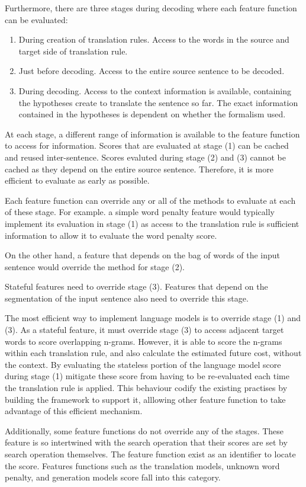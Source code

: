 \documentclass{pbml}
\begin{document}
Furthermore, there are three stages during decoding where each feature function can be evaluated:
\begin{enumerate}
    \item During creation of translation rules. Access to the words in the source and target side of translation rule.
    \item Just before decoding. Access to the entire source sentence to be decoded.
    \item During decoding. Access to the context information is available, containing the hypotheses create to translate the sentence so far. The exact information contained in the hypotheses is dependent on whether the formalism used.
\end{enumerate}
At each stage, a different range of information is available to the feature function to access for information. Scores that are evaluated at stage (1) can be cached and reused inter-sentence. Scores evaluted during stage (2) and (3) cannot be cached as they depend on the entire source sentence. Therefore, it is more efficient to evaluate as early as possible.

Each feature function can override any or all of the methods to evaluate at each of these stage. For example. a simple word penalty feature would typically implement its evaluation in stage (1) as access to the translation rule is sufficient information to allow it to evaluate the word penalty score.

On the other hand, a feature that depends on the bag of words of the input sentence would override the method for stage (2).

Stateful features need to override stage (3). Features that depend on the segmentation of the input sentence also need to override this stage. 

The most efficient way to implement language models is to override stage (1) and (3). As a stateful feature, it must override stage (3) to access adjacent target words to score overlapping n-grams. However, it is able to score the n-grams within each translation rule, and also calculate the estimated future cost, without the context. By evaluating the stateless portion of the language model score during stage (1) mitigate these score from having to be re-evaluated each time the translation rule is applied. This behaviour codify the existing practises by building the framework to support it, alllowing other feature function to take advantage of this efficient mechanism.

Additionally, some feature functions do not override any of the stages. These feature is so intertwined with the search operation that their scores are set by search operation themselves. The feature function exist as an identifier to locate the score. Features functions such as the translation models, unknown word penalty, and generation models score fall into this category.
\end{document}
